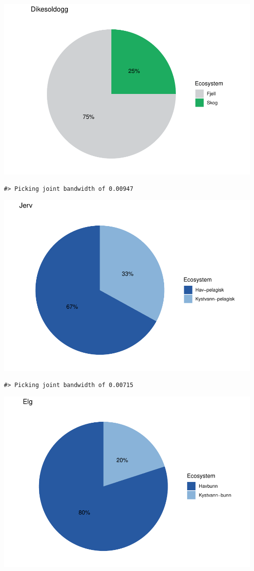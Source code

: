 \documentclass[
]{book}
\begin{document}
\includegraphics{04-other_figures_files/figure-latex/unnamed-chunk-5-1.pdf}

\begin{verbatim}
#> Picking joint bandwidth of 0.00947
\end{verbatim}

\includegraphics{04-other_figures_files/figure-latex/unnamed-chunk-5-2.pdf}

\begin{verbatim}
#> Picking joint bandwidth of 0.00715
\end{verbatim}

\includegraphics{04-other_figures_files/figure-latex/unnamed-chunk-5-3.pdf}
\end{document}
